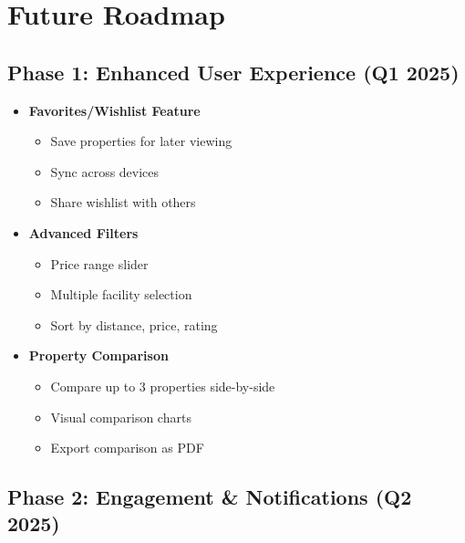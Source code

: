 \documentclass[11pt,a4paper,oneside]{book}
\begin{document}
\chapter{Future Roadmap}

\section{Phase 1: Enhanced User Experience (Q1 2025)}

\begin{itemize}
    \item \textbf{Favorites/Wishlist Feature}
    \begin{itemize}
        \item Save properties for later viewing
        \item Sync across devices
        \item Share wishlist with others
    \end{itemize}
    
    \item \textbf{Advanced Filters}
    \begin{itemize}
        \item Price range slider
        \item Multiple facility selection
        \item Sort by distance, price, rating
    \end{itemize}
    
    \item \textbf{Property Comparison}
    \begin{itemize}
        \item Compare up to 3 properties side-by-side
        \item Visual comparison charts
        \item Export comparison as PDF
    \end{itemize}
\end{itemize}

\section{Phase 2: Engagement \& Notifications (Q2 2025)}
\end{document}
